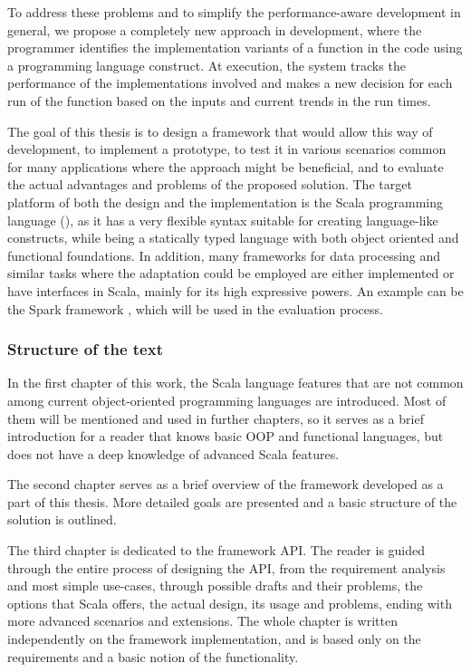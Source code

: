 To address these problems and to simplify the performance-aware development in general, we propose a completely new approach in development, where the programmer identifies the implementation variants of a function in the code using a programming language construct. At execution, the system tracks the performance of the implementations involved and makes a new decision for each run of the function based on the inputs and current trends in the run times.

The goal of this thesis is to design a framework that would allow this way of development, to implement a prototype, to test it in various scenarios common for many applications where the approach might be beneficial, and to evaluate the actual advantages and problems of the proposed solution. The target platform of both the design and the implementation is the Scala programming language (\cite{noauthor_scala_nodate}), as it has a very flexible syntax suitable for creating language-like constructs, while being a statically typed language with both object oriented and functional foundations. In addition, many frameworks for data processing and similar tasks where the adaptation could be employed are either implemented or have interfaces in Scala, mainly for its high expressive powers. An example can be the Spark framework \cite{noauthor_apache_nodate}, which will be used in the evaluation process.

\subsubsection{Structure of the text}

In the first chapter of this work, the Scala language features that are not common among current object-oriented programming languages are introduced. Most of them will be mentioned and used in further chapters, so it serves as a brief introduction for a reader that knows basic OOP and functional languages, but does not have a deep knowledge of advanced Scala features.

The second chapter serves as a brief overview of the framework developed as a part of this thesis. More detailed goals are presented and a basic structure of the solution is outlined.

The third chapter is dedicated to the framework API. The reader is guided through the entire process of designing the API, from the requirement analysis and most simple use-cases, through possible drafts and their problems, the options that Scala offers, the actual design, its usage and problems, ending with more advanced scenarios and extensions. The whole chapter is written independently on the framework implementation, and is based only on the requirements and a basic notion of the functionality.


